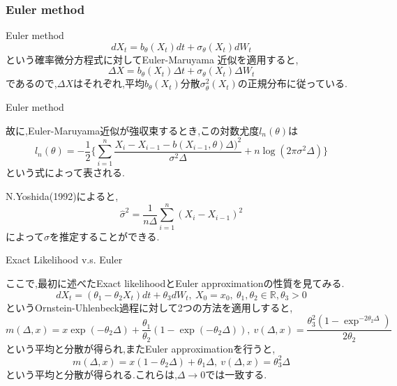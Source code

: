 \documentclass[dvipdfmx,cjk]{beamer}
\numberwithin{equation}{section}
\def\R{\mathbb R}
\begin{document}
\subsubsection{Euler method}
\begin{frame}{Euler method}
\[
dX_t = b_\theta (X_t) dt + \sigma_\theta(X_t) dW_t
\]
という確率微分方程式に対してEuler-Maruyama 近似を適用すると,
\[
\Delta X = b_\theta (X_t) \Delta t + \sigma_\theta(X_t) \Delta W_t
\]
であるので,$\Delta X$はそれぞれ,平均$b_\theta(X_t)$分散$ \sigma^2_\theta(X_t) $の正規分布に従っている.
\end{frame}

\begin{frame}{Euler method}

故に,Euler-Maruyama近似が強収束するとき,この対数尤度$l_n(\theta)$は
\[
l_n(\theta) = -\frac{1}{2}
	 \biggl\{ \sum_{i=1}^n \frac{X_i - X_{i-1} -b(X_{i-1},\theta)\Delta)^2}{\sigma^2 \Delta} + n\log (2\pi \sigma^2 \Delta)
	 \biggl\}
\]
という式によって表される.\par
N.Yoshida(1992)によると,
\[
\hat{\sigma}^2 = \frac{1}{n\Delta} \sum_{i=1}^n (X_i - X_{i-1})^2
\]
によって$\sigma$を推定することができる.
\end{frame}

\begin{frame}{Exact Likelihood v.s. Euler}

ここで,最初に述べたExact likelihoodとEuler approximationの性質を見てみる.
\[
dX_t = (\theta_1 - \theta_2 X_t )  dt + \theta_3 dW_t ,\  X_0=x_0, \ \theta_1,\theta_2\in \R,\theta_3>0
\]
というOrnstein-Uhlenbeck過程に対して2つの方法を適用しすると,\pause
\[
m(\Delta,x) = x\exp(-\theta_2\Delta) + \frac{\theta_1}{\theta_2} (1- \exp(-\theta_2 \Delta)) , 
\ v(\Delta,x) = \frac{\theta_3^2(1-\exp^{-2\theta_2 \Delta})}{2\theta_2} 
\]
という平均と分散が得られ,またEuler approximationを行うと,\pause
\[
m(\Delta,x) = x(1-\theta_2 \Delta) + \theta_1 \Delta , \ v(\Delta,x) = \theta_3^2 \Delta
\]
という平均と分散が得られる.これらは,$\Delta \to 0$では一致する.
\end{frame}
\end{document}
